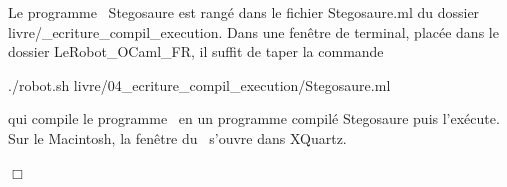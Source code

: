 \begin{corrige}{
Le programme \ocaml\ {\idt Ste\-go\-sau\-re} est rangé dans le
fichier {\idt Stegosaure.ml} du dossier {\idt livre/\_ecriture\_compil\_execution}.
Dans une fenêtre de terminal, placée dans le dossier {\idt LeRobot\_OCaml\_FR}, il suffit de 
taper la commande
\begin{center}
{\idt ./robot.sh livre/04\_ecriture\_compil\_execution/Stegosaure.ml}
\end{center}
qui compile le programme \ocaml\ en un programme compilé {\idt Stegosaure} puis
l'exécute. Sur le Macintosh, la fenêtre du \robot\ s'ouvre dans {\idt XQuartz}.

\noindent $\Box$}\end{corrige}

